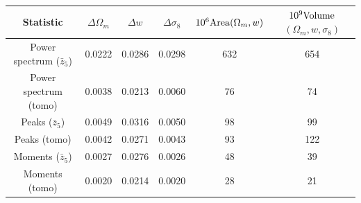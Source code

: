 \documentclass[reprint,aps,prd,superscriptaddress,showkeys,showpacs]{revtex4-1}
\begin{document}
\begin{table}
\begin{tabular}{c|c|c|c|c|c|}
\toprule
                                      \textbf{Statistic} & $\Delta \Omega_m$ & $\Delta w$ & $\Delta \sigma_8$ & $10^6{\rm Area} (\Omega_m,w)$ & $10^9{\rm Volume}$ $(\Omega_m,w,\sigma_8)$ \\ \hline \hline
\midrule
                   Power spectrum ($\bar{z}_5$) &            0.0222 &     0.0286 &            0.0298 &                           632 &                                        654 \\
                          Power spectrum (tomo) &            0.0038 &     0.0213 &            0.0060 &                            76 &                                         74 \\
                            Peaks ($\bar{z}_5$) &            0.0049 &     0.0316 &            0.0050 &                            98 &                                         99 \\
                                   Peaks (tomo) &            0.0042 &     0.0271 &            0.0043 &                            93 &                                        122 \\
                          Moments ($\bar{z}_5$) &            0.0027 &     0.0276 &            0.0026 &                            48 &                                         39 \\
                                 Moments (tomo) &            0.0020 &     0.0214 &            0.0020 &                            28 &                                         21 \\ \hline \hline
           

\end{tabular}
\end{table}
\end{document}
